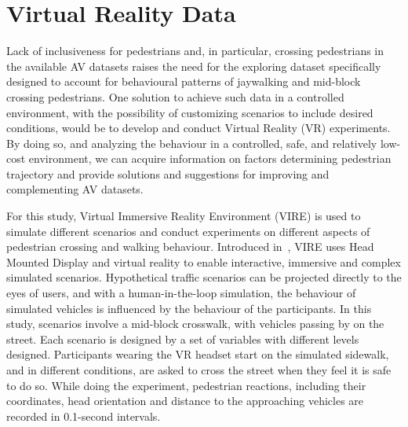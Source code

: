 \section{Virtual Reality Data}
\label{S:t3}
Lack of inclusiveness for pedestrians and, in particular, crossing pedestrians in the available AV datasets raises the need for the exploring dataset specifically designed to account for behavioural patterns of jaywalking and mid-block crossing pedestrians. One solution to achieve such data in a controlled environment, with the possibility of customizing scenarios to include desired conditions, would be to develop and conduct Virtual Reality (VR) experiments. By doing so, and analyzing the behaviour in a controlled, safe, and relatively low-cost environment, we can acquire information on factors determining pedestrian trajectory and provide solutions and suggestions for improving and complementing AV datasets.

For this study, Virtual Immersive Reality Environment (VIRE) is used to simulate different scenarios and conduct experiments on different aspects of pedestrian crossing and walking behaviour. Introduced in~\cite{farooqvire}, VIRE uses Head Mounted Display and virtual reality to enable interactive, immersive and complex simulated scenarios. Hypothetical traffic scenarios can be projected directly to the eyes of users, and with a human-in-the-loop simulation, the behaviour of simulated vehicles is influenced by the behaviour of the participants. In this study, scenarios involve a mid-block crosswalk, with vehicles passing by on the street. Each scenario is designed by a set of variables with different levels designed. Participants wearing the VR headset start on the simulated sidewalk, and in different conditions, are asked to cross the street when they feel it is safe to do so. While doing the experiment, pedestrian reactions, including their coordinates, head orientation and distance to the approaching vehicles are recorded in 0.1-second intervals.   

